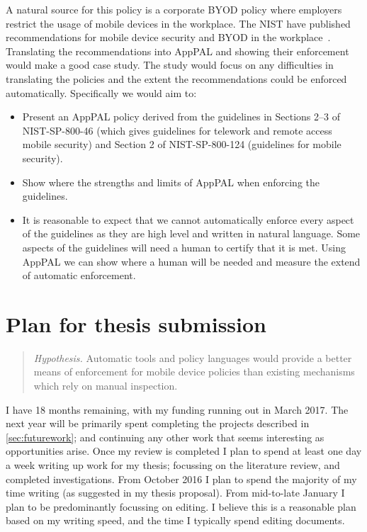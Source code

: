 \documentclass[a4paper]{scrartcl}
\begin{document}
A natural source for this policy is a corporate \ac{BYOD} policy where employers restrict the usage of mobile devices in the workplace.
The \ac{NIST} have published recommendations for mobile device security and \ac{BYOD} in the workplace~\citep{Souppaya:2013jf,Scarfone:2009vy}.
Translating the recommendations into AppPAL and showing their enforcement would make a good case study.
The study would focus on any difficulties in translating the policies and the extent the recommendations could be enforced automatically.
Specifically we would aim to:
\begin{itemize}
  \item
    Present an AppPAL policy derived from the guidelines in Sections 2--3 of NIST-SP-800-46 (which gives guidelines for telework and remote access mobile security) and Section 2 of NIST-SP-800-124 (guidelines for mobile security).
  \item
    Show where the strengths and limits of AppPAL when enforcing the guidelines.
  \item
    It is reasonable to expect that we cannot automatically enforce every aspect of the guidelines as they are high level and written in natural language.
    Some aspects of the guidelines will need a human to certify that it is met.
    Using AppPAL we can show where a human will be needed and measure the extend of automatic enforcement.
\end{itemize}

\section{Plan for thesis submission}

\begin{quote}
  \emph{Hypothesis.} Automatic tools and policy languages would provide a
  better means of enforcement for mobile device policies than existing
  mechanisms which rely on manual inspection.
\end{quote}

I have 18 months remaining, with my funding running out in March 2017.
The next year will be primarily spent completing the projects described in \autoref{sec:futurework}; and continuing any other work that seems interesting as opportunities arise.
Once my review is completed I plan to spend at least one day a week writing up work for my thesis; focussing on the literature review, and completed investigations.
From October 2016 I plan to spend the majority of my time writing (as suggested in my thesis proposal).
From mid-to-late January I plan to be predominantly focussing on editing.
I believe this is a reasonable plan based on my writing speed, and the time I typically spend editing documents.
\end{document}
